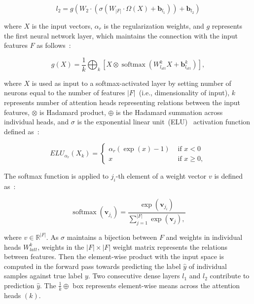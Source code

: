 \begin{equation}
    l_{2}=g\left(W_{2} \cdot\left(\sigma \left(W_{|F|} \cdot \Omega(X)+\boldsymbol{b}_{l_{1}}\right)\right)+\boldsymbol{b}_{l_{2}}\right)
\end{equation}

\hspace*{3.5mm} where $X$ is the input vectors, $\alpha_r$ is the regularization weights, and $g$ represents the first neural network layer, which maintains the connection with the input features $F$ as follows~\cite{vskrlj2020feature}: 

\begin{equation}
    g(X)=\frac{1}{k} \bigoplus_{k}\left[X \otimes \operatorname{softmax}\left(W_{l_{\mathrm{att}}}^{k} X+\boldsymbol{b}_{l_{\mathrm{att}}}^{k}\right)\right],
\end{equation}

\hspace*{3.5mm} where $X$ is used as input to a softmax-activated layer by setting number of neurons equal to the number of features $|F|$~(i.e., dimensionality of input), $k$ represents number of attention heads representing relations between the input features, $\otimes$ is Hadamard product, $\oplus$ is the Hadamard summation across individual heads, and $\sigma$ is the exponential linear unit~(ELU)~\cite{clevert2015fast} activation function defined as~\cite{clevert2015fast}: 

\begin{equation}
    ELU_{\alpha_r}(X_k)=\left\{\begin{array}{ll}
    \alpha_r(\exp (x)-1) & \text { if } x<0 \\
    x & \text { if } x \geq 0,
    \end{array}\right.
    \label{eq:elu_activation}
\end{equation}

\hspace*{3.5mm} The softmax function is applied to $j_{i}$-th element of a weight vector $v$ is defined as~\cite{vskrlj2020feature}:

\begin{equation}
    \operatorname{softmax}\left(\boldsymbol{v}_{j_{i}}\right)=\frac{\exp \left(\boldsymbol{v}_{j_{i}}\right)}{\sum_{j=1}^{|F|} \exp \left(\boldsymbol{v}_{j}\right),}
\end{equation}

\hspace*{3.5mm} where $v \in \mathbb{R}^{|F|}$. As $\sigma$ maintains a bijection between $F$ and weights in individual heads $W_{latt}^{k}$, weights in the $|F| \times|F|$ weight matrix represents the relations between features. Then the element-wise product with the input space is computed in the forward pass towards predicting the label $\hat{y}$ of individual samples against true label ${y}$. Two consecutive dense layers $l_{1}$ and $l_{2}$ contribute to prediction $\hat{y}$. The $\frac{1}{k} \oplus$ box represents element-wise means across the attention heads $(k)$. 

